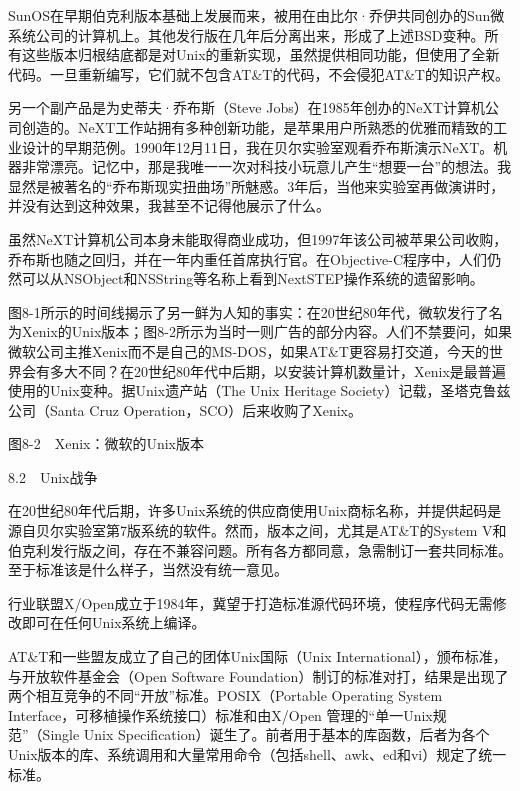 \documentclass[a4paper,12pt,UTF8,twoside]{ctexbook}
\begin{document}
SunOS在早期伯克利版本基础上发展而来，被用在由比尔·乔伊共同创办的Sun微系统公司的计算机上。其他发行版在几年后分离出来，形成了上述BSD变种。所有这些版本归根结底都是对Unix的重新实现，虽然提供相同功能，但使用了全新代码。一旦重新编写，它们就不包含AT\&T的代码，不会侵犯AT\&T的知识产权。

另一个副产品是为史蒂夫·乔布斯（Steve Jobs）在1985年创办的NeXT计算机公司创造的。NeXT工作站拥有多种创新功能，是苹果用户所熟悉的优雅而精致的工业设计的早期范例。1990年12月11日，我在贝尔实验室观看乔布斯演示NeXT。机器非常漂亮。记忆中，那是我唯一一次对科技小玩意儿产生“想要一台”的想法。我显然是被著名的“乔布斯现实扭曲场”所魅惑。3年后，当他来实验室再做演讲时，并没有达到这种效果，我甚至不记得他展示了什么。

虽然NeXT计算机公司本身未能取得商业成功，但1997年该公司被苹果公司收购，乔布斯也随之回归，并在一年内重任首席执行官。在Objective-C程序中，人们仍然可以从NSObject和NSString等名称上看到NextSTEP操作系统的遗留影响。

图8-1所示的时间线揭示了另一鲜为人知的事实：在20世纪80年代，微软发行了名为Xenix的Unix版本；图8-2所示为当时一则广告的部分内容。人们不禁要问，如果微软公司主推Xenix而不是自己的MS-DOS，如果AT\&T更容易打交道，今天的世界会有多大不同？在20世纪80年代中后期，以安装计算机数量计，Xenix是最普遍使用的Unix变种。据Unix遗产站（The Unix Heritage Society）记载，圣塔克鲁兹公司（Santa Cruz Operation，SCO）后来收购了Xenix。



图8-2　Xenix：微软的Unix版本





8.2　Unix战争


在20世纪80年代后期，许多Unix系统的供应商使用Unix商标名称，并提供起码是源自贝尔实验室第7版系统的软件。然而，版本之间，尤其是AT\&T的System V和伯克利发行版之间，存在不兼容问题。所有各方都同意，急需制订一套共同标准。至于标准该是什么样子，当然没有统一意见。

行业联盟X/Open成立于1984年，冀望于打造标准源代码环境，使程序代码无需修改即可在任何Unix系统上编译。

AT\&T和一些盟友成立了自己的团体Unix国际（Unix International），颁布标准，与开放软件基金会（Open Software Foundation）制订的标准对打，结果是出现了两个相互竞争的不同“开放”标准。POSIX（Portable Operating System Interface，可移植操作系统接口）标准和由X/Open 管理的“单一Unix规范”（Single Unix Specification）诞生了。前者用于基本的库函数，后者为各个Unix版本的库、系统调用和大量常用命令（包括shell、awk、ed和vi）规定了统一标准。
\end{document}
